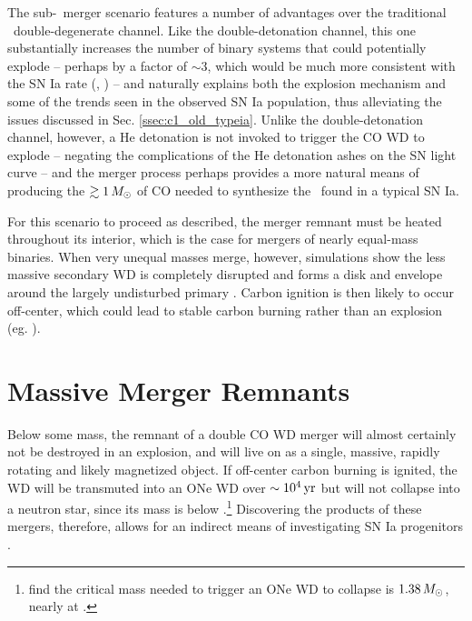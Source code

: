 The sub-\Mch\ merger scenario features a number of advantages over the traditional \Mch\ double-degenerate channel.  Like the double-detonation channel, this one substantially increases the number of binary systems that could potentially explode -- perhaps by a factor of $\sim3$, which would be much more consistent with the SN Ia rate (\citeal{vkercj10}, \citealt{badem12}) -- and naturally explains both the explosion mechanism and some of the trends seen in the observed SN Ia population, thus alleviating the issues discussed in Sec. \ref{ssec:c1_old_typeia}.  Unlike the double-detonation channel, however, a He detonation is not invoked to trigger the CO WD to explode -- negating the complications of the He detonation ashes on the SN light curve -- and the merger process perhaps provides a more natural means of producing the $\gtrsim1\,\Msun$ of CO needed to synthesize the \Ni\ found in a typical SN Ia.

For this scenario to proceed as described, the merger remnant must be heated throughout its interior, which is the case for mergers of nearly equal-mass binaries.  When very unequal masses merge, however, simulations show the less massive secondary WD is completely disrupted and forms a disk and envelope around the largely undisturbed primary \citep{loreig09}.  Carbon ignition is then likely to occur off-center, which could lead to stable carbon burning rather than an explosion (eg. \citealt{yoonpr07, shen+12}).

\section{Massive Merger Remnants}
\label{sec:c1_hotdqs}

Below some mass, the remnant of a double CO WD merger will almost certainly not be destroyed in an explosion, and will live on as a single, massive, rapidly rotating and likely magnetized object.  If off-center carbon burning is ignited, the WD will be transmuted into an ONe WD over $\sim10^4\,\mathrm{yr}$ \citep{nomoi85, shen+12} but will not collapse into a neutron star, since its mass is below \Mch.\footnote{\cite{schwqb15} find the critical mass needed to trigger an ONe WD to collapse is $1.38\,\Msun$, nearly at \Mch.}  Discovering the products of these mergers, therefore, allows for an indirect means of investigating SN Ia progenitors \citep{dunlc15}.


